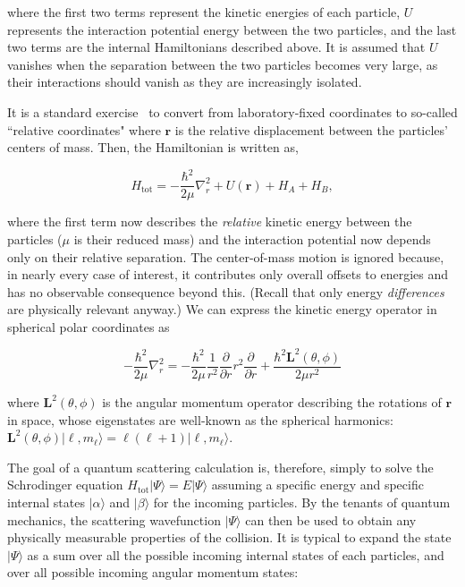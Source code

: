 \documentclass[%
 reprint,
 amsmath,amssymb,
 aps,
 nofootinbib
]{revtex4-1}
\begin{document}
\noindent where the first two terms represent the kinetic energies of each particle, $U$ represents the interaction potential energy between the two particles, and the last two terms are the internal Hamiltonians described above. It is assumed that $U$ vanishes when the separation between the two particles becomes very large, as their interactions should vanish as they are increasingly isolated. 

It is a standard exercise~\cite{ColdChemBook,Krems2017} to convert from laboratory-fixed coordinates to so-called ``relative coordinates" where $\mathbf{r}$ is the relative displacement between the particles' centers of mass. Then, the Hamiltonian is written as,

\begin{equation}
H_\text{tot} = -\frac{\hbar^2}{2\mu} \nabla_r^2 + U(\mathbf{r}) + H_A + H_B,
\label{eq:SchrodFinal}
\end{equation}

\noindent where the first term now describes the \textit{relative} kinetic energy between the particles ($\mu$ is their reduced mass) and the interaction potential now depends only on their relative separation. The center-of-mass motion is ignored because, in nearly every case of interest, it contributes only overall offsets to energies and has no observable consequence beyond this. (Recall that only energy \textit{differences} are physically relevant anyway.) We can express the kinetic energy operator in spherical polar coordinates as

\begin{equation}
-\frac{\hbar^2}{2\mu} \nabla_r^2 = -\frac{\hbar^2}{2\mu} \frac{1}{r^2} \frac{\partial}{\partial r} r^2 \frac{\partial}{\partial r} + \frac{\hbar^2 \mathbf{L}^2(\theta,\phi)}{2\mu r^2}
\end{equation}

\noindent where $\mathbf{L}^2(\theta,\phi)$ is the angular momentum operator describing the rotations of $\mathbf{r}$ in space, whose eigenstates are well-known as the spherical harmonics: $\mathbf{L}^2(\theta,\phi) \lvert \ell, m_\ell \rangle = \ell(\ell+1) \lvert \ell,m_\ell \rangle$. 

The goal of a quantum scattering calculation is, therefore, simply to solve the Schrodinger equation $H_\text{tot} \lvert \Psi \rangle = E \lvert \Psi \rangle$ assuming a specific energy and specific internal states $\lvert \alpha \rangle$ and $\lvert \beta \rangle$ for the incoming particles. By the tenants of quantum mechanics, the scattering wavefunction $\lvert \Psi \rangle$ can then be used to obtain any physically measurable properties of the collision. It is typical to expand the state $\lvert \Psi \rangle$ as a sum over all the possible incoming internal states of each particles, and over all possible incoming angular momentum states: 
\end{document}

